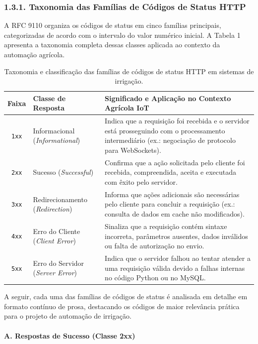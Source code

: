 \subsubsection*{1.3.1. Taxonomia das Famílias de Códigos de Status HTTP}

A RFC 9110 organiza os códigos de status em cinco famílias principais, categorizadas de acordo com o intervalo do valor numérico inicial. A Tabela 1 apresenta a taxonomia completa dessas classes aplicada ao contexto da automação agrícola.

\begin{table}[h!]
\centering
\fontsize{9}{11}\selectfont
\caption{Taxonomia e classificação das famílias de códigos de status HTTP em sistemas de irrigação.}
\begin{tabular}{|c|p{3.2cm}|p{8.5cm}|}
\hline
\textbf{Faixa} & \textbf{Classe de Resposta} & \textbf{Significado e Aplicação no Contexto Agrícola IoT} \\ \hline
\texttt{1xx} & Informacional (\textit{Informational}) & Indica que a requisição foi recebida e o servidor está prosseguindo com o processamento intermediário (ex.: negociação de protocolo para WebSockets). \\ \hline
\texttt{2xx} & Sucesso (\textit{Successful}) & Confirma que a ação solicitada pelo cliente foi recebida, compreendida, aceita e executada com êxito pelo servidor. \\ \hline
\texttt{3xx} & Redirecionamento (\textit{Redirection}) & Informa que ações adicionais são necessárias pelo cliente para concluir a requisição (ex.: consulta de dados em cache não modificados). \\ \hline
\texttt{4xx} & Erro do Cliente (\textit{Client Error}) & Sinaliza que a requisição contém sintaxe incorreta, parâmetros ausentes, dados inválidos ou falta de autorização no envio. \\ \hline
\texttt{5xx} & Erro do Servidor (\textit{Server Error}) & Indica que o servidor falhou ao tentar atender a uma requisição válida devido a falhas internas no código Python ou no MySQL. \\ \hline
\end{tabular}
\end{table}

A seguir, cada uma das famílias de códigos de status é analisada em detalhe em formato contínuo de prosa, destacando os códigos de maior relevância prática para o projeto de automação de irrigação.

\paragraph*{A. Respostas de Sucesso (Classe 2xx)}

